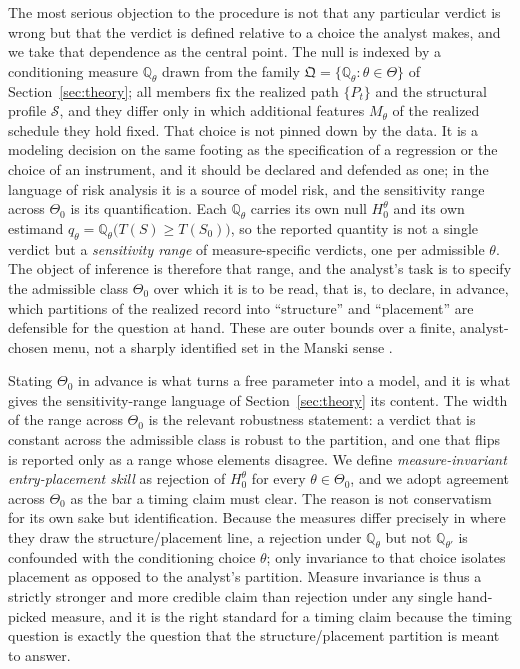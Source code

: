 \documentclass[preprint,12pt]{elsarticle}
\theoremstyle{definition}
\begin{document}
The most serious objection to the procedure is not that any particular verdict is
wrong but that the verdict is defined relative to a choice the analyst makes, and we
take that dependence as the central point. The null is indexed by a conditioning
measure $\mathbb{Q}_\theta$ drawn from the family
$\mathfrak{Q}=\{\mathbb{Q}_\theta:\theta\in\Theta\}$ of Section~\ref{sec:theory}; all
members fix the realized path $\{P_t\}$ and the structural profile $\mathcal{S}$, and
they differ only in which additional features $M_\theta$ of the realized schedule
they hold fixed. That choice is not pinned down by the data. It is a modeling
decision on the same footing as the specification of a regression or the choice of an
instrument, and it should be declared and defended as one; in the language of risk
analysis it is a source of model risk, and the sensitivity range across $\Theta_0$ is
its quantification. Each $\mathbb{Q}_\theta$ carries its own null $H_0^\theta$ and its
own estimand $q_\theta=\mathbb{Q}_\theta\big(T(S)\ge T(S_0)\big)$, so the reported
quantity is not a single verdict but a \emph{sensitivity range} of measure-specific
verdicts, one per admissible $\theta$. The object of inference is therefore that
range, and the analyst's task is to specify the admissible class $\Theta_0$ over
which it is to be read, that is, to declare, in advance, which partitions of the
realized record into ``structure'' and ``placement'' are defensible for the question
at hand. These are outer bounds over a finite, analyst-chosen menu, not a sharply
identified set in the Manski sense \cite{Manski2003,Tamer2010}.

Stating $\Theta_0$ in advance is what turns a free parameter into a model, and it is
what gives the sensitivity-range language of Section~\ref{sec:theory} its content.
The width of the range across $\Theta_0$ is the relevant robustness statement: a
verdict that is constant across the admissible class is robust to the partition, and
one that flips is reported only as a range whose elements disagree. We define
\emph{measure-invariant entry-placement skill} as rejection of $H_0^\theta$ for every
$\theta\in\Theta_0$, and we adopt agreement across $\Theta_0$ as the bar a timing
claim must clear. The reason is not conservatism for its own sake but identification.
Because the measures differ precisely in where they draw the structure/placement
line, a rejection under $\mathbb{Q}_\theta$ but not $\mathbb{Q}_{\theta'}$ is
confounded with the conditioning choice $\theta$; only invariance to that choice
isolates placement as opposed to the analyst's partition. Measure invariance is thus
a strictly stronger and more credible claim than rejection under any single
hand-picked measure, and it is the right standard for a timing claim because the
timing question is exactly the question that the structure/placement partition is
meant to answer.
\end{document}

